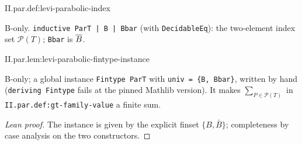 \begin{definition}
\bonly
{}
\end{definition}
\begin{tfformal}{II.par.def:levi-parabolic-index}
\begin{tffidelity}
B-only. \texttt{inductive ParT | B | Bbar} (with \texttt{DecidableEq}): the two-element index set $\mathcal P(T)$; \texttt{Bbar} is $\overline{B}$.
\end{tffidelity}
\end{tfformal}

\begin{lemma}
\bonly
{}
\end{lemma}
\begin{tfformal}{II.par.lem:levi-parabolic-fintype-instance}
\begin{tffidelity}
B-only; a global instance \texttt{Fintype ParT} with \texttt{univ = \{B, Bbar\}}, written by hand (\texttt{deriving Fintype} fails at the pinned Mathlib version). It makes $\sum_{P\in\mathcal P(T)}$ in \texttt{II.par.def:gt-family-value} a finite sum.
\end{tffidelity}
\end{tfformal}
\begin{proof}[Lean proof]
The instance is given by the explicit finset $\{B,\bar B\}$; completeness by case analysis on the two constructors.
\end{proof}

